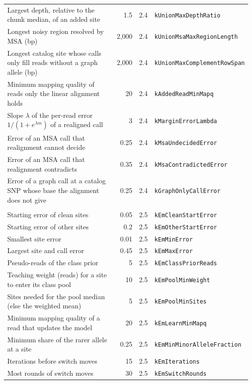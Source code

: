 \documentclass[10pt]{article}
\begin{document}
{\begin{longtable}{@{}>{\raggedright\arraybackslash}p{5.0cm}rrl@{}}
Largest depth, relative to the chunk median, of an added site & 1.5 & 2.4 & \texttt{kUnionMaxDepthRatio} \\
Longest noisy region resolved by MSA (bp) & 2{,}000 & 2.4 & \texttt{kUnionMsaMaxRegionLength} \\
Longest catalog site whose calls only fill reads without a graph allele (bp) & 2{,}000 & 2.4 & \texttt{kUnionMaxComplementRowSpan} \\
Minimum mapping quality of reads only the linear alignment holds & 20 & 2.4 & \texttt{kAddedReadMinMapq} \\
Slope \(\lambda\) of the per-read error \(1/(1+e^{\lambda m})\) of a realigned call & 3 & 2.4 & \texttt{kMarginErrorLambda} \\
Error of an MSA call that realignment cannot decide & 0.25 & 2.4 & \texttt{kMsaUndecidedError} \\
Error of an MSA call that realignment contradicts & 0.35 & 2.4 & \texttt{kMsaContradictedError} \\
Error of a graph call at a catalog SNP whose base the alignment does not give & 0.25 & 2.4 & \texttt{kGraphOnlyCallError} \\
\multicolumn{4}{@{}l}{\emph{Expectation-maximization}} \\
Starting error of clean sites & 0.05 & 2.5 & \texttt{kEmCleanStartError} \\
Starting error of other sites & 0.2 & 2.5 & \texttt{kEmOtherStartError} \\
Smallest site error & 0.01 & 2.5 & \texttt{kEmMinError} \\
Largest site and call error & 0.45 & 2.5 & \texttt{kEmMaxError} \\
Pseudo-reads of the class prior & 5 & 2.5 & \texttt{kEmClassPriorReads} \\
Teaching weight (reads) for a site to enter its class pool & 10 & 2.5 & \texttt{kEmPoolMinWeight} \\
Sites needed for the pool median (else the weighted mean) & 5 & 2.5 & \texttt{kEmPoolMinSites} \\
Minimum mapping quality of a read that updates the model & 20 & 2.5 & \texttt{kEmLearnMinMapq} \\
Minimum share of the rarer allele at a site & 0.25 & 2.5 & \texttt{kEmMinMinorAlleleFraction} \\
Iterations before switch moves & 15 & 2.5 & \texttt{kEmIterations} \\
Most rounds of switch moves & 30 & 2.5 & \texttt{kEmSwitchRounds} \\

\end{longtable}}
\end{document}
